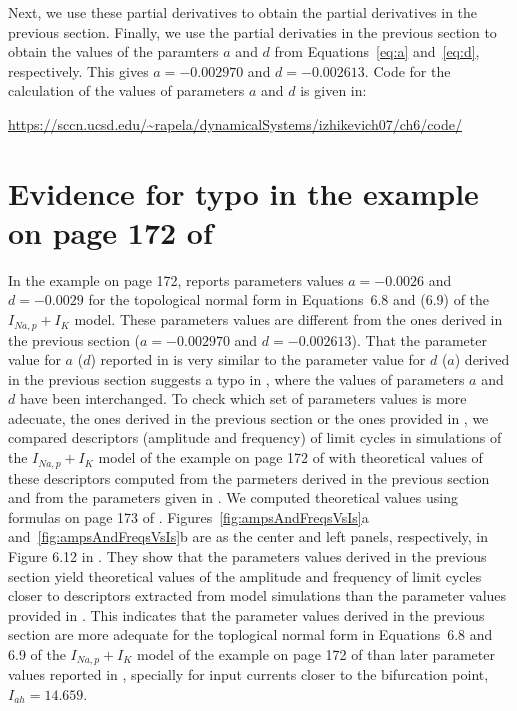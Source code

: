 \documentclass{article}
\theoremstyle{lemma}
\begin{document}
\noindent Next, we use these partial derivatives to obtain the partial
derivatives in the previous section. Finally, we use the partial derivaties in
the previous section to obtain the values of the paramters $a$ and $d$ from
Equations~\ref{eq:a} and~\ref{eq:d}, respectively.  This gives $a=-0.002970$
and $d=-0.002613$.  Code for the calculation of the values of parameters $a$
and $d$ is given in:

\noindent\url{https://sccn.ucsd.edu/~rapela/dynamicalSystems/izhikevich07/ch6/code/}
 
\section{Evidence for typo in the example on page 172 of \citet{izhikevich07}}
\label{sec:evidenceForTypoPage172}

In the example on page 172, \citet{izhikevich07} reports parameters values
$a=-0.0026$ and $d=-0.0029$ for the topological normal form in Equations~6.8
and (6.9) of the $I_{Na,p}+I_K$ model.  These parameters values are different
from the ones derived in the previous section ($a=-0.002970$ and
$d=-0.002613$). That the parameter value for $a$ ($d$) reported in
\citet{izhikevich07} is very similar to the parameter value for $d$ ($a$)
derived in the previous section suggests a typo in \citet{izhikevich07}, where
the values of parameters $a$ and $d$ have been interchanged.
%
To check which set of parameters values is more adecuate, the ones derived in
the previous section or the ones provided in \citet{izhikevich07}, we compared
descriptors (amplitude and frequency) of limit cycles in simulations of the
$I_{Na,p}+I_K$ model of the example on page 172 of \citet{izhikevich07} with
theoretical values of these descriptors computed from the parmeters derived in
the previous section and from the parameters given in \citet{izhikevich07}.
%
We computed theoretical values using formulas on page 173 of
\citet{izhikevich07}.
%
Figures~\ref{fig:ampsAndFreqsVsIs}a and~\ref{fig:ampsAndFreqsVsIs}b are as the
center and left panels, respectively, in Figure 6.12 in \citet{izhikevich07}.
They show that the parameters values derived in the previous section yield
theoretical values of the amplitude and frequency of limit cycles closer to
descriptors extracted from model simulations than the parameter values
provided in \citet{izhikevich07}. This indicates that the parameter values
derived in the previous section are more adequate for the toplogical normal
form in Equations~6.8 and 6.9 of the $I_{Na,p}+I_K$ model of the example
on page 172 of \citet{izhikevich07} than later parameter values reported in
\citet{izhikevich07}, specially for input currents closer to the bifurcation
point, $I_{ah}=14.659$.
\end{document}
